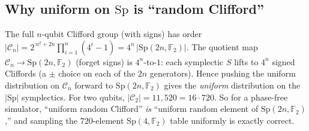 \documentclass[11pt]{article}
\theoremstyle{definition}
\theoremstyle{plain}
\newcommand{\F}{\mathbb{F}}
\newcommand{\Sp}{\mathrm{Sp}}
\newcommand{\Cl}{\mathcal{C}}
\begin{document}
\subsection{Why uniform on \texorpdfstring{$\Sp$}{Sp} is ``random Clifford''}
\label{sec:collapse}
The full $n$-qubit Clifford group (with signs) has order
$|\Cl_n| = 2^{\,n^2+2n}\prod_{i=1}^n(4^i-1) = 4^{n}\,|\Sp(2n,\F_2)|$. The
quotient map $\Cl_n\to\Sp(2n,\F_2)$ (forget signs) is $4^{n}$-to-$1$: each
symplectic $S$ lifts to $4^n$ signed Cliffords (a $\pm$ choice on each of the
$2n$ generators). Hence pushing the uniform distribution on $\Cl_n$ forward to
$\Sp(2n,\F_2)$ gives the \emph{uniform} distribution on the $|\Sp|$ symplectics.
For two qubits, $|\Cl_2|=11{,}520=16\cdot 720$. So for a phase-free simulator,
``uniform random Clifford'' \emph{is} ``uniform random element of
$\Sp(2n,\F_2)$,'' and sampling the $720$-element $\Sp(4,\F_2)$ table uniformly
is exactly correct.
\end{document}
